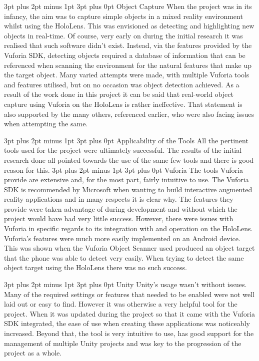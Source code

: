 \documentclass[12pt,a4paper,oneside]{article}
\makeatletter
\renewcommand\subsubsection{\@startsection {subsubsection}{1}{0mm} %
	                           {3pt plus 2pt minus 1pt} %
	                           {3pt plus 0pt} %
	                           {\normalfont\bfseries}}
\renewcommand\subsection{\@startsection {subsection}{1}{0mm} %
                               {3pt plus 2pt minus 1pt} %
                               {3pt plus 0pt} %
                               {\large\bfseries}}
\makeatother
\begin{document}
\subsection{Object Capture}
When the project was in its infancy, the aim was to capture simple objects in a mixed reality environment whilst using the HoloLens. This was envisioned as detecting and highlighting new objects in real-time. Of course, very early on during the initial research it was realised that such software didn't exist. Instead, via the features provided by the Vuforia SDK, detecting objects required a database of information that can be referenced when scanning the environment for the natural features that make up the target object. Many varied attempts were made, with multiple Vuforia tools and features utilised, but on no occasion was object detection achieved. As a result of the work done in this project it can be said that real-world object capture using Vuforia on the HoloLens is rather ineffective. That statement is also supported by the many others, referenced earlier, who were also facing issues when attempting the same.

\subsection{Applicability of the Tools}
All the pertinent tools used for the project were ultimately successful. The results of the initial research done all pointed towards the use of the same few tools and there is good reason for this.
\subsubsection{Vuforia}
The tools Vuforia provide are extensive and, for the most part, fairly intuitive to use. The Vuforia SDK is recommended by Microsoft when wanting to build interactive augmented reality applications and in many respects it is clear why. The features they provide were taken advantage of during development and without which the project would have had very little success. However, there were issues with Vuforia in specific regards to its integration with and operation on the HoloLens. Vuforia's features were much more easily implemented on an Android device. This was shown when the Vuforia Object Scanner used produced an object target that the phone was able to detect very easily. When trying to detect the same object target using the HoloLens there was no such success.

\subsubsection{Unity}
Unity's usage wasn't without issues. Many of the required settings or features that needed to be enabled were not well laid out or easy to find. However it was otherwise a very helpful tool for the project. When it was updated during the project so that it came with the Vuforia SDK integrated, the ease of use when creating these applications was noticeably increased. Beyond that, the tool is very intuitive to use, has good support for the management of multiple Unity projects and was key to the progression of the project as a whole.
\end{document}
